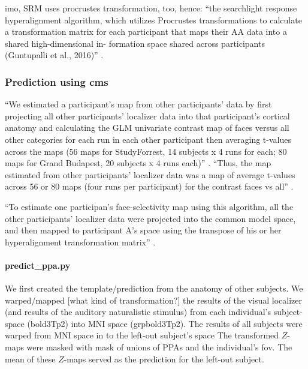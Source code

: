 imo, SRM uses procrustes transformation, too, hence: ``the searchlight response
hyperalignment algorithm, which utilizes Procrustes transformations to calculate
a transformation matrix for each participant that maps their AA data into a
shared high-dimensional in- formation space shared across participants
(Guntupalli et al., 2016)'' \citep{busch2021hybrid}.


\subsubsection{Prediction using \ac{cms}}

%
``We estimated a participant's map from other participants' data by first
projecting all other participants' localizer data into that participant's
cortical anatomy and calculating the GLM univariate contrast map of faces versus
all other categories for each run in each other participant then averaging
t-values across the maps (56 maps for StudyForrest, 14 subjects x 4 runs for
each; 80 maps for Grand Budapest, 20 subjects x 4 runs each)''
\citep{jiahui2020predicting}.
%
``Thus, the map estimated from other participants' localizer data was a map of
average t-values across 56 or 80 maps (four runs per participant) for the
contrast faces vs all'' \citep{jiahui2020predicting}.

``To estimate one participan's face-selectivity map using this algorithm, all
the other participants' localizer data were projected into the common model
space, and then mapped to participant A's space using the transpose of his or
her hyperalignment transformation matrix'' \citep{jiahui2020predicting}.


\paragraph{predict\_ppa.py}



We first created the template/prediction from the anatomy of other subjects.
%
We warped/mapped [what kind of transformation?] the results of the visual
localizer (and results of the auditory naturalistic stimulus) from each
individual's subject-space (bold3Tp2) into MNI space (grpbold3Tp2).
The results of all subjects were warped from MNI space in to the left-out
subject's space
The transformed $Z$-maps were masked with mask of unions of PPAs and the
individual's \ac{fov}.
%
The mean of these $Z$-maps served as the prediction for the left-out subject.

